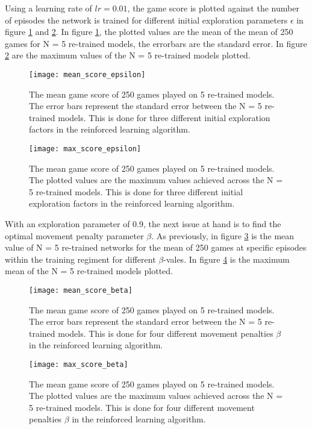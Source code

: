 \documentclass[%
 uio,
 jmp,
 amsmath,amssymb,
 reprint, nofootinbib]{revtex4-1}
\numberwithin{equation}{section}
\begin{document}
Using a learning rate of \(lr=0.01\), the game score is plotted against the number of episodes the network is trained for different initial exploration parameters \(\epsilon\) in figure \ref{fig:07} and \ref{fig:08}. In figure \ref{fig:07}, the plotted values are the mean of the mean of 250 games for N = 5 re-trained models, the errorbars are the standard error. In figure \ref{fig:08} are the maximum values of the N = 5 re-trained models plotted.

\begin{figure}[H]
    \centering
    \texttt{[image: mean\_score\_epsilon]}
    \caption{The mean game score of 250 games played on 5 re-trained models. The error bars represent the standard error between the N = 5 re-trained models. This is done for three different initial exploration factors in the reinforced learning algorithm.}
    \label{fig:07}
\end{figure}

\begin{figure}[H]
    \centering
    \texttt{[image: max\_score\_epsilon]}
    \caption{The mean game score of 250 games played on 5 re-trained models. The plotted values are the maximum values achieved across the N = 5 re-trained models. This is done for three different initial exploration factors in the reinforced learning algorithm.}
    \label{fig:08}
\end{figure}

With an exploration parameter of 0.9, the next issue at hand is to find the optimal movement penalty parameter \(\beta\). As previously, in figure \ref{fig:09} is the mean value of N = 5 re-trained networks for the mean of 250 games at specific episodes within the training regiment for different \(\beta\)-vales. In figure \ref{fig:10} is the maximum mean of the N = 5 re-trained models plotted.

\begin{figure}[H]
    \centering
    \texttt{[image: mean\_score\_beta]}
    \caption{The mean game score of 250 games played on 5 re-trained models. The error bars represent the standard error between the N = 5 re-trained models. This is done for four different movement penalties \(\beta\) in the reinforced learning algorithm.}
    \label{fig:09}
\end{figure}

\begin{figure}[H]
    \centering
    \texttt{[image: max\_score\_beta]}
    \caption{The mean game score of 250 games played on 5 re-trained models. The plotted values are the maximum values achieved across the N = 5 re-trained models. This is done for four different movement penalties \(\beta\) in the reinforced learning algorithm.}
    \label{fig:10}
\end{figure}
\end{document}
